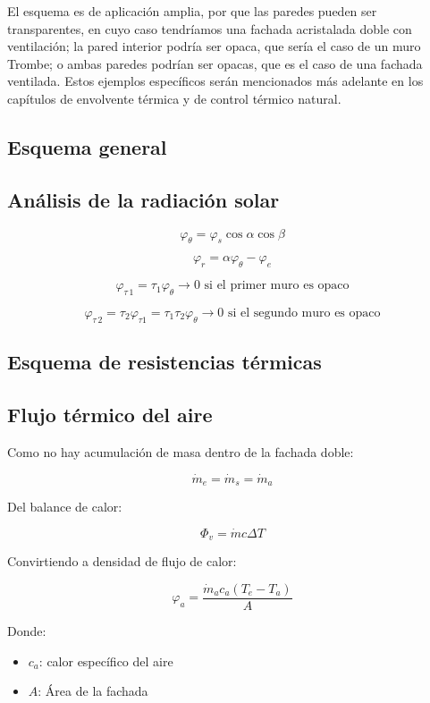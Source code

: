 \documentclass[11pt]{article}
\begin{document}
El esquema es de aplicación amplia, por que las paredes pueden ser transparentes, en cuyo caso tendríamos una fachada acristalada doble con ventilación; la pared interior podría ser opaca, que sería el caso de un muro Trombe; o ambas paredes podrían ser opacas, que es el caso de una fachada ventilada. Estos ejemplos específicos serán mencionados más adelante en los capítulos de envolvente térmica y de control térmico natural.

\subsection{Esquema general}

\subsection{Análisis de la radiación solar}

\[ \varphi _\theta = \varphi _s \cos \alpha \cos \beta \]

\[ \varphi _r = \alpha \varphi _\theta - \varphi _e \]

\[ \varphi _{ \tau \, 1 } = \tau _1 \varphi _\theta \longrightarrow 0 \text{ si el primer muro es opaco} \]

\[ \varphi _{ \tau \, 2 } = \tau _2 \varphi _{ \tau 1 } = \tau _1 \tau _2 \varphi _\theta \longrightarrow 0 \text{ si el segundo muro es opaco} \]

\subsection{Esquema de resistencias térmicas}

\subsection{Flujo térmico del aire}

Como no hay acumulación de masa dentro de la fachada doble:

\[ \dot{m} _e = \dot{m} _s = \dot{m} _a \]

Del balance de calor:

\[ \Phi _v = \dot{m} c \Delta T \]

Convirtiendo a densidad de flujo de calor:

\[ \varphi _a = \frac{ \dot{m} _a c_a \left( T_e - T_a \right) }{ A } \]

Donde:

\begin{itemize}
    \item 
    $ c_a $: calor específico del aire

    \item
    $ A $: Área de la fachada

\end{itemize}
\end{document}
